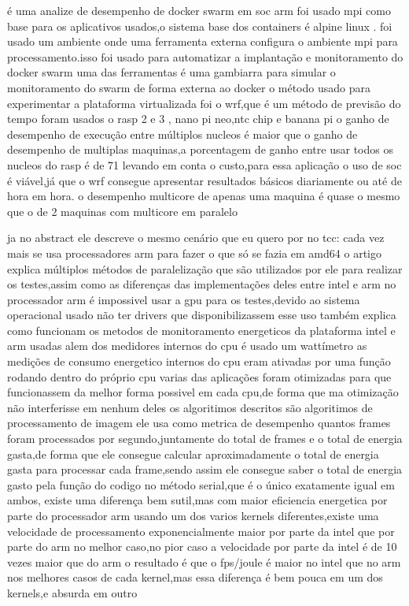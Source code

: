 \documentclass[
	12pt,				%
	openright,			%
	oneside,			%
	a4paper,			%
	english,			%
	french,				%
	spanish,			%
	brazil,				%
	]{abntex2}
\begin{document}
é uma analize de desempenho de docker swarm em soc arm 
foi usado mpi como base para os aplicativos usados,o sistema base dos containers é alpine linux .
foi usado um ambiente onde uma ferramenta externa configura o ambiente mpi para processamento.isso foi usado para automatizar a implantação e monitoramento do docker swarm 
uma das ferramentas é uma gambiarra para simular o monitoramento do swarm de forma externa ao docker
o método usado para experimentar a plataforma virtualizada foi o wrf,que é um método de previsão do tempo
foram usados o rasp 2 e 3 , nano pi neo,ntc chip e banana pi
o ganho de desempenho de execução entre múltiplos nucleos é maior que o ganho de desempenho de multiplas maquinas,a porcentagem de ganho entre usar todos os nucleos do rasp é de 71%
levando em conta o custo,para essa aplicação o uso de soc é viável,já que o wrf consegue apresentar resultados básicos diariamente ou até de hora em hora.
o desempenho multicore de apenas uma maquina é quase o mesmo que o de 2 maquinas com multicore em paralelo
\cite{DockerSwarmsocmpi}

ja no abstract ele descreve o mesmo cenário que eu quero por no tcc: cada vez mais se usa processadores arm para fazer o que só se fazia em amd64
o artigo explica múltiplos métodos de paralelização que são utilizados por ele para realizar os testes,assim como as diferenças das implementações deles entre intel e arm
no processador arm é impossivel usar a gpu para os testes,devido ao sistema operacional usado não ter drivers que disponibilizassem esse uso
também explica como funcionam os metodos de monitoramento energeticos da plataforma intel e arm usadas
alem dos medidores internos do cpu é usado um wattímetro
as medições de consumo energetico internos do cpu eram ativadas por uma função rodando dentro do próprio cpu 
varias das aplicações foram otimizadas para que funcionassem da melhor forma possivel em cada cpu,de forma que ma otimização não interferisse em nenhum deles
os algoritimos descritos são algoritimos de processamento de imagem
ele usa como metrica de desempenho quantos frames foram processados por segundo,juntamente do total de frames e o total de energia gasta,de forma que ele consegue calcular aproximadamente o total de energia gasta para processar cada frame,sendo assim ele consegue saber o total de energia gasto pela função do codigo
no método serial,que é o único exatamente igual em ambos, existe uma diferença bem sutil,mas com maior eficiencia energetica por parte do processador arm
usando um dos varios kernels diferentes,existe uma velocidade de processamento exponencialmente maior por parte da intel que por parte do arm no melhor caso,no pior caso a velocidade por parte da intel é de 10 vezes maior que do arm
o resultado é que o fps/joule é maior no intel que no arm nos melhores casos de cada kernel,mas essa diferença é bem pouca em um dos kernels,e absurda em outro
\cite{armvsintel}
\end{document}

